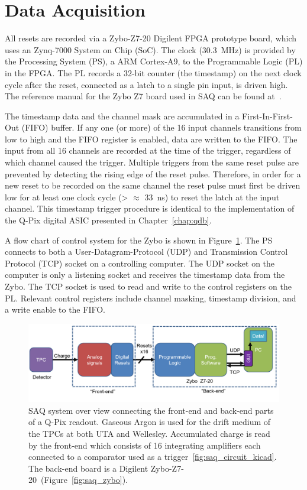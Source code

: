 \section{Data Acquisition}

All resets are recorded via a Zybo-Z7-20 Digilent FPGA prototype board, which uses an Zynq-7000 System on Chip (SoC).
The clock (30.3~\unit{MHz}) is provided by the Processing System (PS), a ARM Cortex-A9, to the Programmable Logic (PL) in the FPGA.
The PL records a 32-bit counter (the timestamp) on the next clock cycle after the reset, connected as a latch to a single pin input, is driven high.
The reference manual for the Zybo Z7 board used in SAQ can be found at~\citep{zybo_zy_reference}.

The timestamp data and the channel mask are accumulated in a First-In-First-Out (FIFO) buffer.
If any one (or more) of the 16 input channels transitions from low to high and the FIFO register is enabled, data are written to the FIFO.
The input from all 16 channels are recorded at the time of the trigger, regardless of which channel caused the trigger.
Multiple triggers from the same reset pulse are prevented by detecting the rising edge of the reset pulse.
Therefore, in order for a new reset to be recorded on the same channel the reset pulse must first be driven low for at least one clock cycle (> $\approx$ 33~\unit{ns}) to reset the latch at the input channel.
This timestamp trigger procedure is identical to the implementation of the Q-Pix digital ASIC presented in Chapter~\ref{chap:qdb}.

A flow chart of control system for the Zybo is shown in Figure~\ref{fig:saq_diagram}.
The PS connects to both a User-Datagram-Protocol (UDP) and Transmission Control Protocol (TCP) socket on a controlling computer.
The UDP socket on the computer is only a listening socket and receives the timestamp data from the Zybo.
The TCP socket is used to read and write to the control registers on the PL.
Relevant control registers include channel masking, timestamp division, and a write enable to the FIFO.

\begin{figure}[]
\centering
\includegraphics[width=\textwidth]{images/saq_daq_back-end_summary.png}
\caption{SAQ system over view connecting the front-end and back-end parts of a Q-Pix readout.
Gaseous Argon is used for the drift medium of the TPCs at both UTA and Wellesley.
Accumulated charge is read by the front-end which consists of 16 integrating amplifiers each connected to a comparator used as a trigger~\ref{fig:saq_circuit_kicad}.
The back-end board is a Digilent Zybo-Z7-20~(Figure~\ref{fig:saq_zybo}).
}
\label{fig:saq_diagram}
\end{figure}

